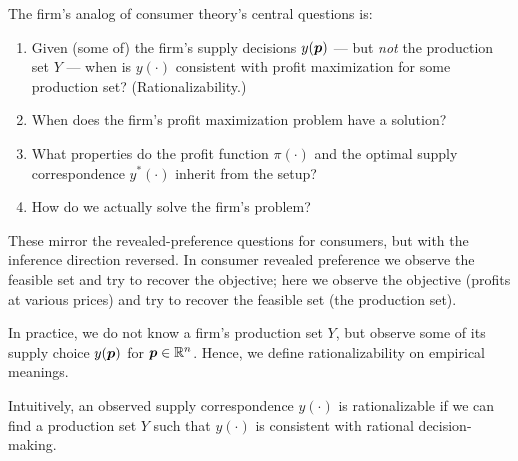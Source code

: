 The firm's analog of consumer theory's central questions is:

\begin{enumerate}
\item
  Given (some of) the firm's supply decisions \(y(\bm p)\) — but \emph{not}
  the production set \(Y\) — when is \(y(\cdot)\) consistent with
  profit maximization for some production set? (Rationalizability.)
\item
  When does the firm's profit maximization problem have a solution?
\item
  What properties do the profit function \(\pi(\cdot)\) and the optimal
  supply correspondence \(y^*(\cdot)\) inherit from the setup?
\item
  How do we actually solve the firm's problem?
\end{enumerate}

These mirror the revealed-preference questions for consumers, but with
the inference direction reversed. In consumer revealed preference we
observe the feasible set and try to recover the objective; here we
observe the objective (profits at various prices) and try to recover
the feasible set (the production set).

In practice, we do not know a firm's production set
\(Y\), but observe some of its supply choice \(y(\bm p)\) for
\(\bm p\in \mathbb R^n\). Hence, we define rationalizability on empirical
meanings.


Intuitively, an observed supply correspondence \(y(\cdot)\) is
  rationalizable if we can find a production set \(Y\) such that
  \(y(\cdot)\) is consistent with rational decision-making.


